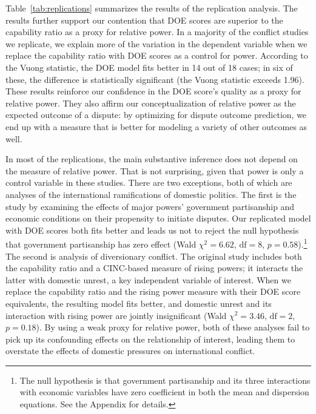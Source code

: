 Table~\ref{tab:replications} summarizes the results of the replication analysis.
The results further support our contention that DOE scores are superior to the capability ratio as a proxy for relative power.
In a majority of the conflict studies we replicate, we explain more of the variation in the dependent variable when we replace the capability ratio with DOE scores as a control for power.
According to the Vuong statistic, the DOE model fits better in 14 out of 18 cases; in six of these, the difference is statistically significant (the Vuong statistic exceeds 1.96).
These results reinforce our confidence in the DOE score's quality as a proxy for relative power.
They also affirm our conceptualization of relative power as the expected outcome of a dispute: by optimizing for dispute outcome prediction, we end up with a measure that is better for modeling a variety of other outcomes as well.

In most of the replications, the main substantive inference does not depend on the measure of relative power.
That is not surprising, given that power is only a control variable in these studies.
There are two exceptions, both of which are analyses of the international ramifications of domestic politics.
The first is the study by \citet{Arena:2009gk} examining the effects of major powers' government partisanship and economic conditions on their propensity to initiate disputes.
Our replicated model with DOE scores both fits better and leads us not to reject the null hypothesis that government partisanship has zero effect (Wald $\chi^2 = 6.62$, $\text{df} = 8$, $p = 0.58$).\footnote{%
  The null hypothesis is that government partisanship and its three interactions with economic variables have zero coefficient in both the mean and dispersion equations.
  See the Appendix for details.
}
The second is  analysis of diversionary conflict.
The original study includes both the capability ratio and a CINC-based measure of rising powers; it interacts the latter with domestic unrest, a key independent variable of interest.
When we replace the capability ratio and the rising power measure with their DOE score equivalents, the resulting model fits better, and domestic unrest and its interaction with rising power are jointly insignificant (Wald $\chi^2 = 3.46$, $\text{df} = 2$, $p = 0.18$).
By using a weak proxy for relative power, both of these analyses fail to pick up its confounding effects on the relationship of interest, leading them to overstate the effects of domestic pressures on international conflict.

